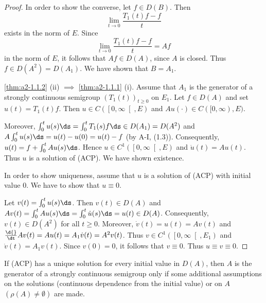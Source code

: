 \begin{proof}
In order to show the converse, let $f \in D(B)$.
Then 
\[ 
\lim_{t \to 0} \frac{T_{1}(t)f - f}{t}
\]
exists in the norm of $E$.
Since  
\[ 
\lim_{t \to 0} \frac{T_{1}(t)f - f}{t} = Af
\]
in the norm of $E$, it follows that $Af \in D(A)$, since $A$ is closed.
Thus $f \in D(A^{2}) = D(A_{1})$.
We have shown that $B = A_{1}$.

\ref{thm:a2-1.1.2} (\lnm ii) $\implies$ \ref{thm:a2-1.1.1} (\lnm i).
Assume that $A_{1}$ is the generator of a strongly continuous semigroup $(T_{1}(t))_{t \geq 0}$ on $E_{1}$.
Let $f \in D(A)$ and set $u(t) = T_{1}(t)f$.
Then $u \in C(\left[0,\infty\right[,E)$ and $Au(\cdot) \in C([0,\infty),E)$.

Moreover, $\int_{0}^{t} u(s) \ds = \int_{0}^{t} T_{1}(s) f   \ds \in D(A_{1}) = D(A^{2})$ and $A\int_{0}^{t} u(s) \ds = u(t) - u(0) = u(t) - f$ (by A-I, (1.3)).
Consequently, $u(t) = f + \int_{0}^{t} Au(s) \ds$.
Hence $u \in C^{1}(\left[0,\infty  \right[,E)$ and $\dot{u}(t) = Au(t)$.
Thus $u$ is a solution of (ACP).
We have shown existence.

In order to show uniqueness, assume that $u$ is a solution of (ACP) with initial value $0$.
We have to show that $u \equiv 0$.

Let $v(t) = \int_{0}^{t} u(s) \ds$.
Then $v(t) \in D(A)$ and $Av(t) = \int_{0}^{t} Au(s) \ds =
 \int_{0}^{t} \dot{u}(s) \ds = 
 u(t) \in D(A)$.
Consequently, $v(t) \in D(A^{2})$ for all $t \geq 0$.
Moreover, $\dot{v}(t) = u(t) = Av(t)$ 
and 
$\frac{\d{}}{\dt}Av(t) = Au(t) = A_{1}\dot{v}(t) = A^{2}v(t)$.
Thus $v \in C^{1}(\left[0,\infty\right[,E_{1})$ and $\dot{v}(t) = A_{1}v(t)$.
Since $v(0) = 0$, it follows that $v \equiv 0$.
Thus $u \equiv v  \equiv 0$.
\end{proof}
If (ACP) has a unique solution for every initial value in $D(A)$, then $A$ is the generator of a strongly continuous semigroup only if some additional assumptions on the solutions (continuous dependence from the initial value) or on $A$ $(\rho(A) \neq \emptyset)$ are made.
